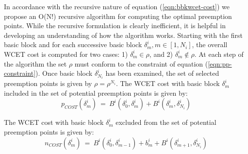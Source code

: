 \noindent
In accordance with the recursive nature of equation (\ref{eqn:bbkwcet-cost}) we propose an O(N!) recursive algorithm for computing the optimal preemption points.  While the recursive formulation is clearly inefficient, it is helpful in developing an understanding of how the algorithm works.  Starting with the first basic block and for each successive basic block \begin{math}\delta_{m}^{i}, m \in [1,N_{i}]\end{math}, the overall WCET cost is computed for two cases: 1) \begin{math}\delta_{m}^{i} \in \rho\end{math}, and 2) \begin{math}\delta_{m}^{i} \not\in \rho\end{math}.  At each step of the algorithm the set \begin{math}\rho\end{math} must conform to the constraint of equation (\ref{eqn:pp-constraint}).  Once basic block \begin{math}\delta_{N_{i}}^{i}\end{math} has been examined, the set of selected preemption points is given by \begin{math}\rho = \rho^{N_{i}}\end{math}.  The WCET cost with basic block \begin{math}\delta_{m}^{i}\end{math} included in the set of potential preemption points is given by:
\begin{equation}\label{eqn:pcost-bb}
p_{COST}(\delta_{m}^{i})\ =\ B^{i}(\delta_{0}^{i},\delta_{m}^{i}) + B^{i}(\delta_{m}^{i},\delta_{N_{i}}^{i})
\end{equation}

The WCET cost with basic block \begin{math}\delta_{m}^{i}\end{math} excluded from the set of potential preemption points is given by:
\begin{equation}\label{eqn:npcost-bb}
n_{COST}(\delta_{m}^{i})\ =\ B^{i}(\delta_{0}^{i},\delta_{m-1}^{i}) + b_{m}^{i} + B^{i}(\delta_{m+1}^{i},\delta_{N_{i}}^{i})
\end{equation}

